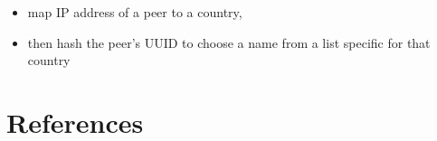 \documentclass[12pt,a4paper,]{adreport}
\begin{document}
\begin{itemize}
  \begin{itemize}
  \itemsep1pt\parskip0pt
  \item
    map IP address of a peer to a country,
  \item
    then hash the peer's UUID to choose a name from a list specific for
    that country
  \end{itemize}
\end{itemize}

\chapter{References}\label{references}
\end{document}
